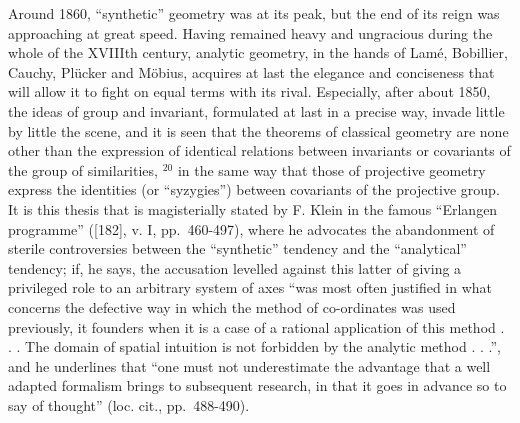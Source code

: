 Around 1860, ``synthetic'' geometry was at its peak, but the end of its reign was approaching at great speed. Having remained heavy and ungracious during the whole of the XVIIIth century, analytic geometry, in the hands of Lamé, Bobillier, Cauchy, Plücker and Möbius, acquires at last the elegance and conciseness that will allow it to fight on equal terms with its rival. Especially, after about 1850, the ideas of group and invariant, formulated at last in a precise way, invade little by little the scene, and it is seen that the theorems of classical geometry are none other than the expression of identical relations between invariants or covariants of the group of similarities, \(^{20}\) in the same way that those of projective geometry express the identities (or ``syzygies'') between covariants of the projective group. It is this thesis that is magisterially stated by F. Klein in the famous ``Erlangen programme'' ({[}182{]}, v. I, pp.~460-497), where he advocates the abandonment of sterile controversies between the ``synthetic'' tendency and the ``analytical'' tendency; if, he says, the accusation levelled against this latter of giving a privileged role to an arbitrary system of axes ``was most often justified in what concerns the defective way in which the method of co-ordinates was used previously, it founders when it is a case of a rational application of this method . . . The domain of spatial intuition is not forbidden by the analytic method . . .'', and he underlines that ``one must not underestimate the advantage that a well adapted formalism brings to subsequent research, in that it goes in advance so to say of thought'' (loc. cit., pp.~488-490).

